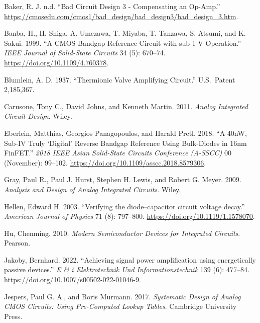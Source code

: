 \documentclass[
  a4paper,
  DIV=11,
  numbers=noendperiod]{scrartcl}
\newlength{\cslhangindent}
\newenvironment{CSLReferences}[2] %
 {\begin{list}{}{%
  \setlength{\itemindent}{0pt}
  \setlength{\leftmargin}{0pt}
  \setlength{\parsep}{0pt}
  \ifodd #1
   \setlength{\leftmargin}{\cslhangindent}
   \setlength{\itemindent}{-1\cslhangindent}
  \fi
  \setlength{\itemsep}{#2\baselineskip}}}
 {\end{list}}
\begin{document}
\label{refs}
\begin{CSLReferences}{1}{0}
Baker, R. J. n.d. {``Bad Circuit Design 3 - Compensating an Op-Amp.''}
\url{https://cmosedu.com/cmos1/bad_design/bad_design3/bad_design_3.htm}.

Banba, H., H. Shiga, A. Umezawa, T. Miyaba, T. Tanzawa, S. Atsumi, and
K. Sakui. 1999. {``A {CMOS} Bandgap Reference Circuit with {sub-1-V}
Operation.''} \emph{IEEE Journal of Solid-State Circuits} 34 (5):
670--74. \url{https://doi.org/10.1109/4.760378}.

Blumlein, A. D. 1937. {``Thermionic Valve Amplifying Circuit.''}
U.S.~Patent 2,185,367.

Carusone, Tony C., David Johns, and Kenneth Martin. 2011. \emph{{Analog
Integrated Circuit Design}}. Wiley.

Eberlein, Matthias, Georgios Panagopoulos, and Harald Pretl. 2018. {``{A
40nW, Sub-IV Truly {`Digital'} Reverse Bandgap Reference Using
Bulk-Diodes in 16nm FinFET}.''} \emph{2018 IEEE Asian Solid-State
Circuits Conference (A-SSCC)} 00 (November): 99--102.
\url{https://doi.org/10.1109/asscc.2018.8579306}.

Gray, Paul R., Paul J. Hurst, Stephen H. Lewis, and Robert G. Meyer.
2009. \emph{{Analysis and Design of Analog Integrated Circuits}}. Wiley.

Hellen, Edward H. 2003. {``{Verifying the diode--capacitor circuit
voltage decay}.''} \emph{American Journal of Physics} 71 (8): 797--800.
\url{https://doi.org/10.1119/1.1578070}.

Hu, Chenming. 2010. \emph{Modern Semiconductor Devices for Integrated
Circuits}. Pearson.

Jakoby, Bernhard. 2022. {``{Achieving signal power amplification using
energetically passive devices}.''} \emph{E \& i Elektrotechnik Und
Informationstechnik} 139 (6): 477--84.
\url{https://doi.org/10.1007/s00502-022-01046-9}.

Jespers, Paul G. A., and Boris Murmann. 2017. \emph{Systematic Design of
Analog CMOS Circuits: Using Pre-Computed Lookup Tables}. Cambridge
University Press.


\end{CSLReferences}
\end{document}

